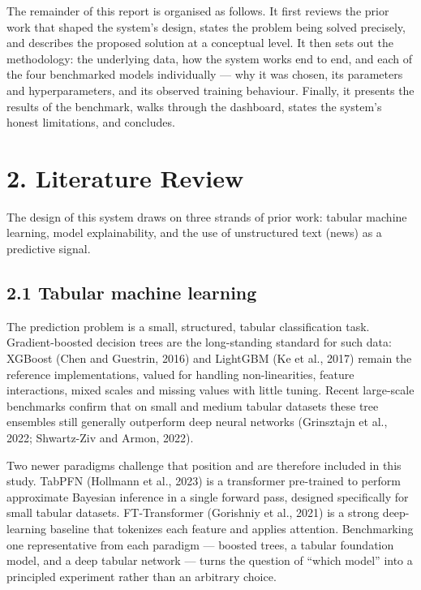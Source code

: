 \documentclass[11pt]{article}
\begin{document}
The remainder of this report is organised as follows. It first reviews the prior work that shaped the system's design, states the problem being solved precisely, and describes the proposed solution at a conceptual level. It then sets out the methodology: the underlying data, how the system works end to end, and each of the four benchmarked models individually --- why it was chosen, its parameters and hyperparameters, and its observed training behaviour. Finally, it presents the results of the benchmark, walks through the dashboard, states the system's honest limitations, and concludes.

\section{2. Literature Review}

The design of this system draws on three strands of prior work: tabular machine learning, model explainability, and the use of unstructured text (news) as a predictive signal.

\subsection{2.1 Tabular machine learning}

The prediction problem is a small, structured, tabular classification task. Gradient-boosted decision trees are the long-standing standard for such data: XGBoost (Chen and Guestrin, 2016) and LightGBM (Ke et al., 2017) remain the reference implementations, valued for handling non-linearities, feature interactions, mixed scales and missing values with little tuning. Recent large-scale benchmarks confirm that on small and medium tabular datasets these tree ensembles still generally outperform deep neural networks (Grinsztajn et al., 2022; Shwartz-Ziv and Armon, 2022).

Two newer paradigms challenge that position and are therefore included in this study. TabPFN (Hollmann et al., 2023) is a transformer pre-trained to perform approximate Bayesian inference in a single forward pass, designed specifically for small tabular datasets. FT-Transformer (Gorishniy et al., 2021) is a strong deep-learning baseline that tokenizes each feature and applies attention. Benchmarking one representative from each paradigm --- boosted trees, a tabular foundation model, and a deep tabular network --- turns the question of ``which model'' into a principled experiment rather than an arbitrary choice.
\end{document}
